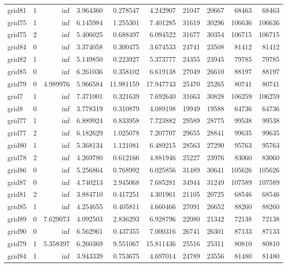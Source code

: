 \begin{longtable}{|l|r|r|r|r|r|r|r|r|r|}
grid81 & 1 & inf & 3.964360 & 0.278547 & 4.242907 & 21047 & 20667 & 68463 & 68463 \\
grid75 & 1 & inf & 6.145984 & 1.255301 & 7.401285 & 31619 & 30296 & 106636 & 106636 \\
grid75 & 2 & inf & 5.406025 & 0.688497 & 6.094522 & 31677 & 30354 & 106715 & 106715 \\
grid84 & 0 & inf & 3.374058 & 0.300475 & 3.674533 & 24741 & 23508 & 81412 & 81412 \\
grid82 & 1 & inf & 5.149850 & 0.223927 & 5.373777 & 24355 & 23945 & 79785 & 79785 \\
grid85 & 0 & inf & 6.261036 & 0.358102 & 6.619138 & 27049 & 26610 & 88197 & 88197 \\
grid79 & 0 & 4.989976 & 5.966584 & 11.981159 & 17.947743 & 25470 & 25265 & 80741 & 80741 \\
grid7 & 1 & inf & 7.371001 & 0.321639 & 7.692640 & 31663 & 30828 & 106259 & 106259 \\
grid8 & 0 & inf & 3.778319 & 0.310879 & 4.089198 & 19949 & 19588 & 64736 & 64736 \\
grid77 & 1 & inf & 6.889924 & 0.833958 & 7.723882 & 29589 & 28775 & 99538 & 99538 \\
grid77 & 2 & inf & 6.182629 & 1.025078 & 7.207707 & 29655 & 28841 & 99635 & 99635 \\
grid80 & 1 & inf & 5.368134 & 1.121081 & 6.489215 & 28563 & 27290 & 95763 & 95763 \\
grid78 & 2 & inf & 4.269780 & 0.612166 & 4.881946 & 25227 & 23976 & 83060 & 83060 \\
grid86 & 0 & inf & 5.256864 & 0.768992 & 6.025856 & 31489 & 30641 & 105626 & 105626 \\
grid87 & 0 & inf & 4.740213 & 2.945068 & 7.685281 & 34944 & 31249 & 107589 & 107589 \\
grid81 & 2 & inf & 3.884710 & 0.417251 & 4.301961 & 21105 & 20725 & 68546 & 68546 \\
grid85 & 1 & inf & 4.254655 & 0.405811 & 4.660466 & 27091 & 26652 & 88260 & 88260 \\
grid89 & 0 & 7.629073 & 4.092503 & 2.836293 & 6.928796 & 22080 & 21342 & 72138 & 72138 \\
grid90 & 0 & inf & 6.562961 & 0.437355 & 7.000316 & 26741 & 26301 & 87133 & 87133 \\
grid79 & 1 & 5.358397 & 6.260369 & 9.551067 & 15.811436 & 25516 & 25311 & 80810 & 80810 \\
grid84 & 1 & inf & 3.943339 & 0.753675 & 4.697014 & 24789 & 23556 & 81480 & 81480 \\

\end{longtable}
